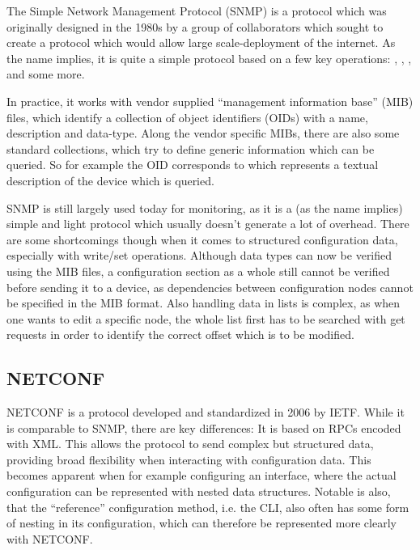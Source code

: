 The Simple Network Management Protocol (SNMP)\cite{fedor_simple_1990} is a protocol which was originally
designed in the 1980s by a group of collaborators which sought to create a protocol which would
allow large scale-deployment of the internet.
As the name implies, it is quite a simple protocol based on a few key operations:
, , ,  and some more.

In practice, it works with vendor supplied ``management information base'' (MIB) files, which identify a collection
of object identifiers (OIDs) with a name, description and data-type. 
Along the vendor specific MIBs, there are also some standard collections,
which try to define generic information which can be queried.
So for example the OID  corresponds to 
which represents a textual description of the device which is queried.

SNMP is still largely used today for monitoring, as it is a (as the name implies) simple and light protocol
which usually doesn't generate a lot of overhead. There are some shortcomings though when it comes to
structured configuration data, especially with write/set operations. Although data types can now be verified
using the MIB files, a configuration section as a whole still cannot be verified before sending it to a device,
as dependencies between configuration nodes cannot be specified in the MIB format. Also handling data
in lists is complex, as when one wants to edit a specific node, the whole list first has to be searched
with get requests in order to identify the correct offset which is to be modified.

\subsection{NETCONF}

NETCONF is a protocol developed and standardized in 2006 by \acrshort{IETF}.
While it is comparable to SNMP, there are key differences:
It is based on \acrfull{RPC}s encoded with XML.
This allows the protocol to send complex but structured data, providing broad flexibility
when interacting with configuration data. 
This becomes apparent when for example configuring an interface, where the actual configuration
can be represented with nested data structures.
Notable is also, that the ``reference'' configuration method, i.e. the CLI, also often has some form
of nesting in its configuration, which can therefore be represented more clearly with NETCONF.

